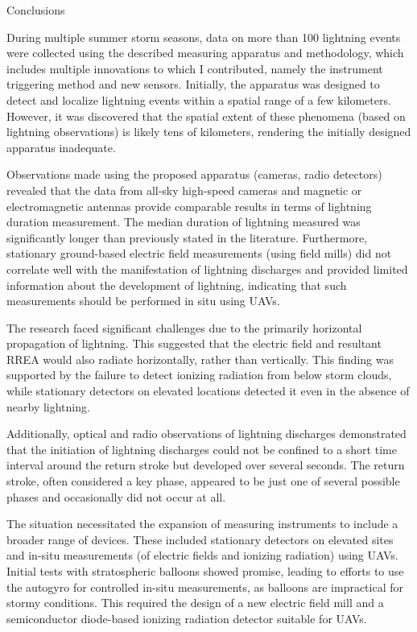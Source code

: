\sec Conclusions

During multiple summer storm seasons, data on more than 100 lightning events were collected using the described measuring apparatus and methodology, which includes multiple innovations to which I contributed, namely the instrument triggering method and new sensors. Initially, the apparatus was designed to detect and localize lightning events within a spatial range of a few kilometers. However, it was discovered that the spatial extent of these phenomena (based on lightning observations) is likely tens of kilometers, rendering the initially designed apparatus inadequate.

Observations made using the proposed apparatus (cameras, radio detectors) revealed that the data from all-sky high-speed cameras and magnetic or electromagnetic antennas provide comparable results in terms of lightning duration measurement. The median duration of lightning measured was significantly longer than previously stated in the literature. Furthermore, stationary ground-based electric field measurements (using field mills) did not correlate well with the manifestation of lightning discharges and provided limited information about the development of lightning, indicating that such measurements should be performed in situ using UAVs.

The research faced significant challenges due to the primarily horizontal propagation of lightning. This suggested that the electric field and resultant RREA would also radiate horizontally, rather than vertically. This finding was supported by the failure to detect ionizing radiation from below storm clouds, while stationary detectors on elevated locations detected it even in the absence of nearby lightning.

Additionally, optical and radio observations of lightning discharges demonstrated that the initiation of lightning discharges could not be confined to a short time interval around the return stroke but developed over several seconds. The return stroke, often considered a key phase, appeared to be just one of several possible phases and occasionally did not occur at all.

The situation necessitated the expansion of measuring instruments to include a broader range of devices. These included stationary detectors on elevated sites and in-situ measurements (of electric fields and ionizing radiation) using UAVs. Initial tests with stratospheric balloons showed promise, leading to efforts to use the autogyro for controlled in-situ measurements, as balloons are impractical for stormy conditions. This required the design of a new electric field mill and a semiconductor diode-based ionizing radiation detector suitable for UAVs.

